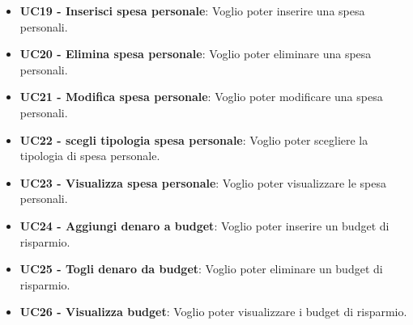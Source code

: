 \begin{itemize}
    \item \textbf{UC19 - Inserisci spesa personale}: Voglio poter inserire una spesa personali.
    \item \textbf{UC20 - Elimina spesa personale}: Voglio poter eliminare una spesa personali.
    \item \textbf{UC21 - Modifica spesa personale}: Voglio poter modificare una spesa personali.
    \item \textbf{UC22 - scegli tipologia spesa personale}: Voglio poter scegliere la tipologia di spesa personale.
    \item \textbf{UC23 - Visualizza spesa personale}: Voglio poter visualizzare le spesa personali.
    \item \textbf{UC24 - Aggiungi denaro a budget}: Voglio poter inserire un budget di risparmio.
    \item \textbf{UC25 - Togli denaro da budget}: Voglio poter eliminare un budget di risparmio.
    \item \textbf{UC26 - Visualizza budget}: Voglio poter visualizzare i budget di risparmio.
\end{itemize}

